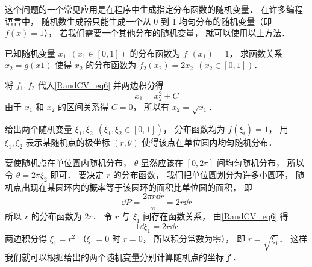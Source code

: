 这个问题的一个常见应用是在程序中生成指定分布函数的随机变量． 在许多编程语言中， 随机数生成器只能生成一个从 0 到 1 均匀分布的随机变量（即 $f(x) = 1$）， 若我们需要一个其他分布的随机变量， 就可以使用以上方法．

\begin{example}{}
已知随机变量 $x_1\ \ (x_1\in [0,1])$ 的分布函数为 $f_1(x_1) = 1$， 求函数关系 $x_2 = g(x1)$ 使得 $x_2$ 的分布函数为 $f_2(x_2) = 2x_2\ \ (x_2\in [0,1])$．

将 $f_1, f_2$ 代入\autoref{RandCV_eq6} 并两边积分得
\begin{equation}
x_1 = x_2^2 + C
\end{equation}
由于 $x_1$ 和 $x_2$ 的区间关系得 $C = 0$， 所以有 $x_2 = \sqrt{x_1}$．
\end{example}

\begin{example}{}\label{RandCV_ex3}
给出两个随机变量 $\xi_1, \xi_2\ \ (\xi_1, \xi_2\in [0,1])$， 分布函数均为 $f(\xi_i) = 1$， 用 $\xi_1, \xi_2$ 表示某随机点的极坐标 $(r,\theta)$ 使得该点在单位圆内均匀随机分布．

要使随机点在单位圆内随机分布， $\theta$ 显然应该在 $[0,2\pi]$ 间均匀随机分布， 所以令 $\theta = 2\pi\xi_2$ 即可． 要决定 $r$ 的分布函数， 我们把单位圆划分为许多小圆环， 随机点出现在某圆环内的概率等于该圆环的面积比单位圆的面积， 即
\begin{equation}
\dd{P} = \frac{2\pi r\dd{r}}{\pi} = 2r\dd{r}
\end{equation}
所以 $r$ 的分布函数为 $2r$． 令 $r$ 与 $\xi_1$ 间存在函数关系， 由\autoref{RandCV_eq6} 得
\begin{equation}
1\dd{\xi_1} = 2r\dd{r}
\end{equation}
两边积分得 $\xi_1 = r^2$ （$\xi_1 = 0$ 时 $r = 0$， 所以积分常数为零）， 即 $r = \sqrt{\xi_1}$． 这样我们就可以根据给出的两个随机变量分别计算随机点的坐标了．
\end{example}